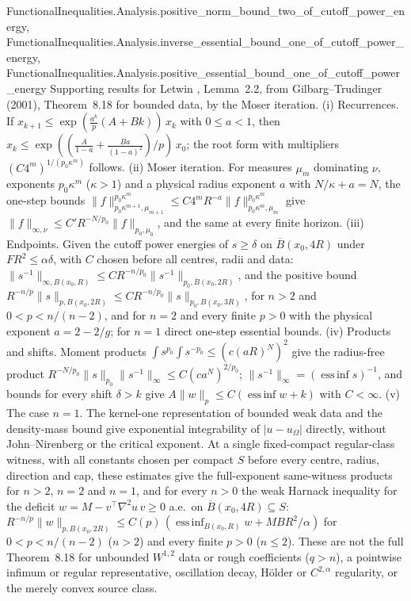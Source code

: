 \begin{lemma}
{        FunctionalInequalities.Analysis.positive_norm_bound_two_of_cutoff_power_energy,
        FunctionalInequalities.Analysis.inverse_essential_bound_one_of_cutoff_power_energy,
        FunctionalInequalities.Analysis.positive_essential_bound_one_of_cutoff_power_energy}
  \leanok
  Supporting results for Letwin \cite{Letwin2026QuadraticKLS}, Lemma~2.2, from Gilbarg--Trudinger (2001), Theorem~8.18 for
  bounded data, by the Moser iteration.
  (i) Recurrences. If $x_{k+1}\le\exp(\frac{a^k}{p}(A+Bk))\,x_k$ with $0\le a<1$, then
  $x_k\le\exp((\frac{A}{1-a}+\frac{Ba}{(1-a)^2})/p)\,x_0$; the root form with multipliers $(C4^m)^{1/(p_0\kappa^m)}$ follows.
  (ii) Moser iteration. For measures $\mu_m$ dominating $\nu$, exponents $p_0\kappa^m$ ($\kappa>1$) and a physical radius
  exponent $a$ with $N/\kappa+a=N$, the one-step bounds
  $\|f\|_{p_0\kappa^{m+1},\mu_{m+1}}^{p_0\kappa^m}\le C4^mR^{-a}\|f\|_{p_0\kappa^m,\mu_m}^{p_0\kappa^m}$ give
  $\|f\|_{\infty,\nu}\le C'R^{-N/p_0}\|f\|_{p_0,\mu_0}$, and the same at every finite horizon.
  (iii) Endpoints. Given the cutoff power energies of $s\ge\delta$ on $\overline B(x_0,4R)$ under $FR^2\le\alpha\delta$, with $C$
  chosen before all centres, radii and data: $\|s^{-1}\|_{\infty,B(x_0,R)}\le C R^{-n/p_0}\|s^{-1}\|_{p_0,\overline B(x_0,2R)}$,
  and the positive bound $R^{-n/p}\|s\|_{p,B(x_0,2R)}\le CR^{-n/p_0}\|s\|_{p_0,B(x_0,3R)}$, for $n>2$ and $0<p<n/(n-2)$, and
  for $n=2$ and every finite $p>0$ with the physical exponent $a=2-2/g$; for $n=1$ direct one-step essential bounds.
  (iv) Products and shifts. Moment products $\int s^{p_0}\int s^{-p_0}\le(c(aR)^N)^2$ give the radius-free product
  $R^{-N/p_0}\|s\|_{p_0}\|s^{-1}\|_\infty\le C(ca^N)^{2/p_0}$; $\|s^{-1}\|_\infty=(\operatorname{ess\,inf}s)^{-1}$, and
  bounds for every shift $\delta>k$ give $A\|w\|_p\le C(\operatorname{ess\,inf}w+k)$ with $C<\infty$.
  (v) The case $n=1$. The kernel-one representation of bounded weak data and the density-mass bound give exponential
  integrability of $|u-u_\Omega|$ directly, without John--Nirenberg or the critical exponent.
  At a single fixed-compact regular-class witness, with all constants chosen per
  compact $S$ before every centre, radius, direction and cap, these estimates give the full-exponent same-witness products for $n>2$, $n=2$ and $n=1$, and
  for every $n>0$ the weak Harnack inequality for the deficit $w=M-v^{\top}\nabla^2u\,v\ge0$ a.e.\ on
  $\overline B(x_0,4R)\subseteq S$:
  $R^{-n/p}\|w\|_{p,B(x_0,2R)}\le C(p)\,(\operatorname{ess\,inf}_{B(x_0,R)}w+MBR^2/\alpha)$ for $0<p<n/(n-2)$ ($n>2$) and
  every finite $p>0$ ($n\le2$). These are not the full Theorem~8.18 for unbounded $W^{1,2}$ data or rough coefficients
  ($q>n$), a pointwise infimum or regular representative, oscillation decay, H\"older or $C^{2,\alpha}$ regularity, or the
  merely convex source class.
\end{lemma}
